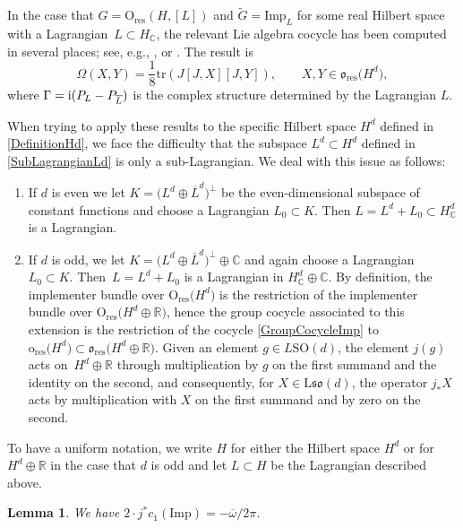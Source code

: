 \documentclass[pdftex]{sigma}
\numberwithin{equation}{section}
\newtheorem{Lemma}[Theorem]{Lemma}
\newcommand{\R}{\mathbb{R}}
\newcommand{\C}{\mathbb{C}}
\newcommand{\tr}{\mathrm{tr}}
\newcommand{\SO}{\mathrm{SO}}
\newcommand{\res}{\mathrm{res}}
\newcommand{\Imp}{\mathrm{Imp}}
\renewcommand{\O}{\mathrm{O}}
\renewcommand{\L}{\mathrm{L}}
\begin{document}
In the case that $G = \O_{\res}(H, [L])$ and $\tilde{G} = \Imp_L$ for some real Hilbert space with a Lagrangian~$L \subset H_\C$, the relevant Lie algebra cocycle has been computed in several places; see, e.g., \cite[Theorem~6.10]{Araki1}, \cite[Theorem~10.2]{NeebSemibounded} or \cite[Theorem~6]{Ottesen}.
The result is
\begin{equation}
\label{GroupCocycleImp}
 \Omega(X, Y) = \frac{1}{8} \tr(J [J, X] [J, Y]), \qquad X, Y \in \mathfrak{o}_{\res}\big(H^d\big),
\end{equation}
where $\Gamma = {\rm i}(P_{L} - P_{\overline{L}})$ is the complex structure determined by the Lagrangian $L$.

When trying to apply these results to the specific Hilbert space $H^d$ defined in \eqref{DefinitionHd}, we face the difficulty that the subspace $L^d \subset H^d$ defined in \eqref{SubLagrangianLd} is only a sub-Lagrangian.
We deal with this issue as follows:
\begin{enumerate}\itemsep=0pt
\item[(i)]
If $d$ is even we let $K = \big(L^d \oplus \overline{L}^d\big)^\perp$ be the even-dimensional subspace of constant functions and choose a Lagrangian $L_0 \subset K$.
Then $L = L^d + L_0 \subset H^d_\C$ is a Lagrangian.
\item[(ii)]
If $d$ is odd, we let $K = \big(L^d \oplus \overline{L}^d\big)^\perp \oplus \C$ and again choose a Lagrangian $L_0 \subset K$.
Then~${L = L^d + L_0}$ is a Lagrangian in $H^d_\C \oplus \C$.
By definition, the implementer bundle over $\O_{\res}\big(H^d\big)$ is the restriction of the implementer bundle over $\O_{\res}\big(H^d \oplus \R\big)$, hence the group cocycle associated to this extension is the restriction of the cocycle \eqref{GroupCocycleImp} to~$\mathrm{o}_{\res}\big(H^d\big) \subset \mathfrak{o}_{\res}\big(H^d \oplus \R\big)$.
Given an element $g \in L\SO(d)$, the element $j(g)$ acts on~$H^d \oplus \R$ through multiplication by $g$ on the first summand and the identity on the second, and consequently, for $X \in \L \mathfrak{so}(d)$, the operator $j_*X$ acts by multiplication with $X$ on the first summand and by zero on the second.
\end{enumerate}
To have a uniform notation, we write $H$ for either the Hilbert space $H^d$ or for $H^d \oplus \R$ in the case that $d$ is odd and let $L \subset H$ be the Lagrangian described above.

\begin{Lemma}\label{LemmaA4}
 We have $2 \cdot j^*c_1(\Imp) = - \overline{\omega}/2\pi$.
\end{Lemma}
\end{document}
